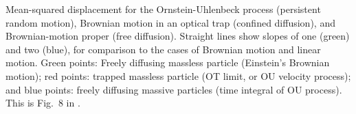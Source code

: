 \label{fig:OT_MSD} Mean-squared displacement for the Ornstein-Uhlenbeck process (persistent random motion), Brownian motion in an optical trap (confined diffusion), and Brownian-motion proper (free diffusion). Straight lines show slopes of one (green) and two (blue), for comparison to the cases of Brownian motion and linear motion.
Green points: Freely diffusing massless particle (Einstein's Brownian motion); red points: trapped massless particle (OT limit, or OU velocity process); and blue points: freely diffusing massive particles (time integral of OU process). This is Fig.~8 in \cite{Norrelykke:2011}.